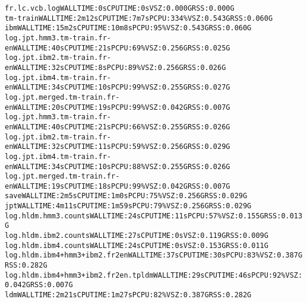 \documentclass[11pt,letterpaper]{article}
\begin{document}
\begin{tiny}
\begin{alltt}
            fr.lc.vcb.log                                 WALL TIME: 0s       CPU TIME: 0s                     VSZ: 0.000G    RSS: 0.000G
         tm-train                                         WALL TIME: 2m12s    CPU TIME: 7m7s      PCPU: 334\%   VSZ: 0.543G    RSS: 0.060G
      ibm                                                 WALL TIME: 15m2s    CPU TIME: 10m8s     PCPU: 95\%    VSZ: 0.543G    RSS: 0.060G
         log.jpt.hmm3.tm-train.fr-en                      WALL TIME: 40s      CPU TIME: 21s       PCPU: 69\%    VSZ: 0.256G    RSS: 0.025G
         log.jpt.ibm2.tm-train.fr-en                      WALL TIME: 32s      CPU TIME: 8s        PCPU: 89\%    VSZ: 0.256G    RSS: 0.026G
         log.jpt.ibm4.tm-train.fr-en                      WALL TIME: 34s      CPU TIME: 10s       PCPU: 99\%    VSZ: 0.255G    RSS: 0.027G
         log.jpt.merged.tm-train.fr-en                    WALL TIME: 20s      CPU TIME: 19s       PCPU: 99\%    VSZ: 0.042G    RSS: 0.007G
            log.jpt.hmm3.tm-train.fr-en                   WALL TIME: 40s      CPU TIME: 21s       PCPU: 66\%    VSZ: 0.255G    RSS: 0.026G
            log.jpt.ibm2.tm-train.fr-en                   WALL TIME: 32s      CPU TIME: 11s       PCPU: 59\%    VSZ: 0.256G    RSS: 0.029G
            log.jpt.ibm4.tm-train.fr-en                   WALL TIME: 34s      CPU TIME: 10s       PCPU: 88\%    VSZ: 0.255G    RSS: 0.026G
            log.jpt.merged.tm-train.fr-en                 WALL TIME: 19s      CPU TIME: 18s       PCPU: 99\%    VSZ: 0.042G    RSS: 0.007G
         save                                             WALL TIME: 2m5s     CPU TIME: 1m0s      PCPU: 75\%    VSZ: 0.256G    RSS: 0.029G
      jpt                                                 WALL TIME: 4m11s    CPU TIME: 1m59s     PCPU: 79\%    VSZ: 0.256G    RSS: 0.029G
         log.hldm.hmm3.counts                             WALL TIME: 24s      CPU TIME: 11s       PCPU: 57\%    VSZ: 0.155G    RSS: 0.013G
         log.hldm.ibm2.counts                             WALL TIME: 27s      CPU TIME: 0s                     VSZ: 0.119G    RSS: 0.009G
         log.hldm.ibm4.counts                             WALL TIME: 24s      CPU TIME: 0s                     VSZ: 0.153G    RSS: 0.011G
         log.hldm.ibm4+hmm3+ibm2.fr2en                    WALL TIME: 37s      CPU TIME: 30s       PCPU: 83\%    VSZ: 0.387G    RSS: 0.282G
         log.hldm.ibm4+hmm3+ibm2.fr2en.tpldm              WALL TIME: 29s      CPU TIME: 46s       PCPU: 92\%    VSZ: 0.042G    RSS: 0.007G
      ldm                                                 WALL TIME: 2m21s    CPU TIME: 1m27s     PCPU: 82\%    VSZ: 0.387G    RSS: 0.282G

\end{alltt}
\end{tiny}
\end{document}
